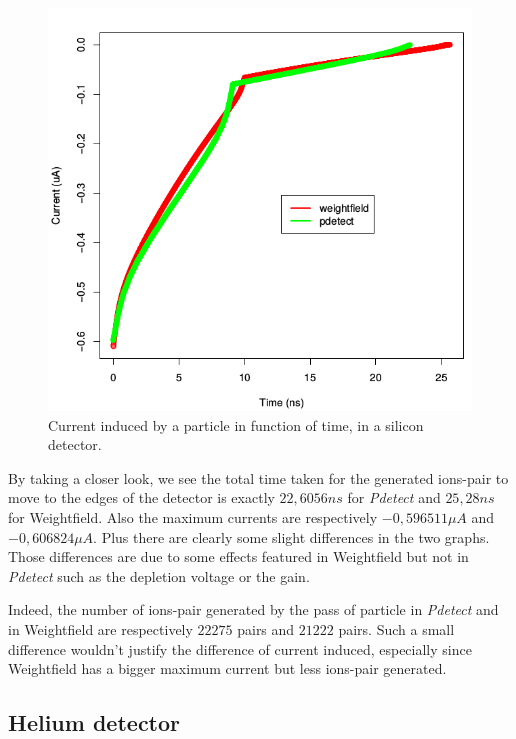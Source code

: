 \documentclass[11pt]{article}
\begin{document}
			\begin{figure}[H]
			  \center
			  \includegraphics[scale=0.5]{images/applications/silicon_current.png}
			  \caption{Current induced by a particle in function of time, in a silicon detector.}
			  \label{fig:silicon}
			\end{figure}

			By taking a closer look, we see the total time taken for the generated ions-pair to move to the edges of the
			detector is exactly $22,6056ns$ for \textit{Pdetect} and $25,28ns$ for Weightfield. Also the maximum 
			currents are respectively $-0,596511\mu A$ and $-0,606824\mu A$. Plus there are clearly some slight 
			differences in the two graphs. Those differences are due to some effects featured in Weightfield
			but not in \textit{Pdetect} such as the depletion voltage or the gain.

			Indeed, the number of ions-pair generated by the pass of particle in \textit{Pdetect} and in Weightfield
			are respectively $22275$ pairs and $21222$ pairs. Such a small difference wouldn't justify the difference
			of current induced, especially since Weightfield has a bigger maximum current but less ions-pair generated.

	\subsection{Helium detector}
\end{document}

